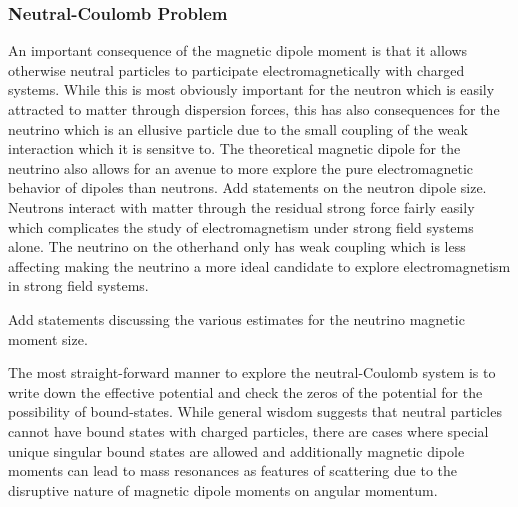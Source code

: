\subsubsection{Neutral-Coulomb Problem}\label{ajsss:neutral}
\noindent An important consequence of the magnetic dipole moment is that it allows otherwise neutral particles to participate electromagnetically with charged systems. While this is most obviously important for the neutron which is easily attracted to matter through dispersion forces, this has also consequences for the neutrino which is an ellusive particle due to the small coupling of the weak interaction which it is sensitve to. The theoretical magnetic dipole for the neutrino also allows for an avenue to more explore the pure electromagnetic behavior of dipoles than neutrons. {\color{red}Add statements on the neutron dipole size.} Neutrons interact with matter through the residual strong force fairly easily which complicates the study of electromagnetism under strong field systems alone. The neutrino on the otherhand only has weak coupling which is less affecting making the neutrino a more ideal candidate to explore electromagnetism in strong field systems.

{\color{red}Add statements discussing the various estimates for the neutrino magnetic moment size.}

The most straight-forward manner to explore the neutral-Coulomb system is to write down the effective potential and check the zeros of the potential for the possibility of bound-states. While general wisdom suggests that neutral particles cannot have bound states with charged particles, there are cases where special unique singular bound states are allowed and additionally magnetic dipole moments can lead to mass resonances as features of scattering due to the disruptive nature of magnetic dipole moments on angular momentum.














